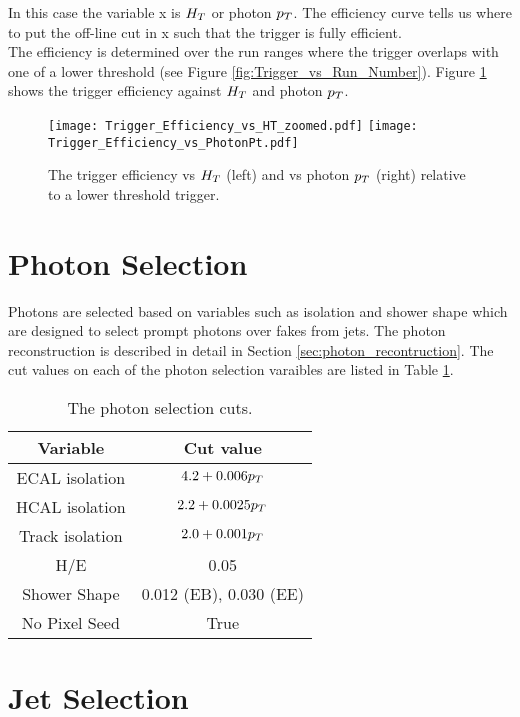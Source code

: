 In this case the variable x is $H_{T}$ or photon $p_{T}$. The efficiency curve tells
us where to put the off-line cut in x such that the trigger is fully efficient.
\\

The efficiency is determined over the run ranges where the trigger overlaps with
one of a lower threshold (see Figure \ref{fig:Trigger_vs_Run_Number}). Figure 
\ref{fig:Trigger_Efficiency} shows the trigger efficiency against $H_{T}$ and 
photon $p_{T}$.

\begin{figure}
\texttt{[image: Trigger\_Efficiency\_vs\_HT\_zoomed.pdf]}
\texttt{[image: Trigger\_Efficiency\_vs\_PhotonPt.pdf]}
\caption{The trigger efficiency vs $H_{T}$ (left) and vs photon $p_{T}$ (right)
relative to a lower threshold trigger.}
\label{fig:Trigger_Efficiency}
\end{figure}

\section{Photon Selection}

Photons are selected based on variables such as isolation and shower shape which
are designed to select prompt photons over fakes from jets. The photon 
reconstruction is described in detail in Section \ref{sec:photon_recontruction}. 
The cut values on each of the photon selection varaibles are listed in Table 
\ref{tab:photoncuts}. 

\begin{table}
\begin{center}
\begin{tabular}{|c|c|}
\hline
Variable & Cut value \\
\hline
ECAL isolation & $4.2 + 0.006p_{T}$ \\
HCAL isolation & $2.2 + 0.0025p_{T}$ \\
Track isolation & $2.0 + 0.001p_{T}$ \\
H/E & 0.05 \\
Shower Shape & 0.012 (EB), 0.030 (EE) \\
No Pixel Seed & True \\
\hline
\end{tabular}
\end{center}
\caption{The photon selection cuts.}
\label{tab:photoncuts}
\end{table}

\section{Jet Selection}

